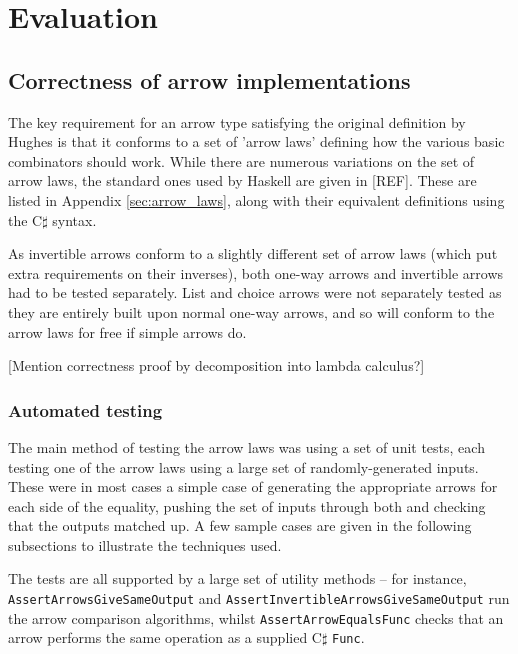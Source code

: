 \documentclass[12pt,twoside,notitlepage]{report}
\begin{document}
\cleardoublepage



\chapter{Evaluation}

\section{Correctness of arrow implementations}

The key requirement for an arrow type satisfying the original definition by Hughes is that it conforms to a set of 'arrow laws' defining how the various basic combinators should work. While there are numerous variations on the set of arrow laws, the standard ones used by Haskell are given in [REF]. These are listed in Appendix \ref{sec:arrow_laws}, along with their equivalent definitions using the C$\sharp$ syntax.

As invertible arrows conform to a slightly different set of arrow laws (which put extra requirements on their inverses), both one-way arrows and invertible arrows had to be tested separately. List and choice arrows were not separately tested as they are entirely built upon normal one-way arrows, and so will conform to the arrow laws for free if simple arrows do.

[Mention correctness proof by decomposition into lambda calculus?]

\subsection{Automated testing}

The main method of testing the arrow laws was using a set of unit tests, each testing one of the arrow laws using a large set of randomly-generated inputs. These were in most cases a simple case of generating the appropriate arrows for each side of the equality, pushing the set of inputs through both and checking that the outputs matched up. A few sample cases are given in the following subsections to illustrate the techniques used.

The tests are all supported by a large set of utility methods -- for instance, \texttt{AssertArrowsGiveSameOutput} and \texttt{AssertInvertibleArrowsGiveSameOutput} run the arrow comparison algorithms, whilst \texttt{AssertArrowEqualsFunc} checks that an arrow performs the same operation as a supplied C$\sharp$ \texttt{Func}.
\end{document}
